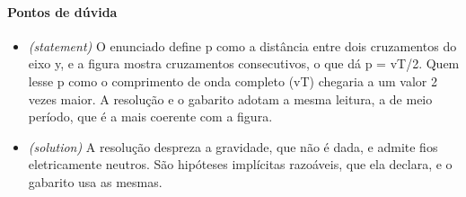\documentclass{article}%
\begin{document}
\paragraph{Pontos de dúvida}%
\begin{itemize}%
\item%
\textit{(statement)} O enunciado define p como a distância entre dois cruzamentos do eixo y, e a figura mostra cruzamentos consecutivos, o que dá p = vT/2. Quem lesse p como o comprimento de onda completo (vT) chegaria a um valor 2 vezes maior. A resolução e o gabarito adotam a mesma leitura, a de meio período, que é a mais coerente com a figura.%
\item%
\textit{(solution)} A resolução despreza a gravidade, que não é dada, e admite fios eletricamente neutros. São hipóteses implícitas razoáveis, que ela declara, e o gabarito usa as mesmas.%
\end{itemize}%
\end{document}

